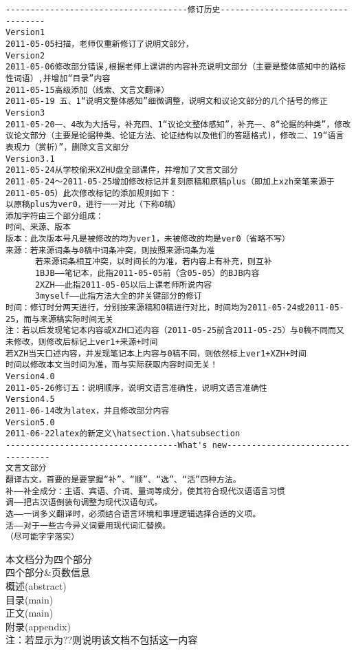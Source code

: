 \begin{verbatim}
-------------------------------------修订历史----------------------------------
Version1
2011-05-05扫描，老师仅重新修订了说明文部分，
Version2
2011-05-06修改部分错误,根据老师上课讲的内容补充说明文部分（主要是整体感知中的路标性词语）,并增加“目录”内容
2011-05-15高级添加（线索、文言文翻译）
2011-05-19 五、1“说明文整体感知”细微调整，说明文和议论文部分的几个括号的修正
Version3
2011-05-20一、4改为大括号，补充四、1“议论文整体感知”，补充一、8“论据的种类”，修改议论文部分（主要是论据种类、论证方法、论证结构以及他们的答题格式)，修改二、19“语言表现力（赏析）”，删除文言文部分
Version3.1
2011-05-24从学校偷来XZHU盘全部课件，并增加了文言文部分
2011-05-24～2011-05-25增加修改标记并复刻原稿和原稿plus（即加上xzh亲笔来源于2011-05-05）此次修改标记的添加规则如下：
以原稿plus为ver0，进行一一对比（下称0稿）
添加字符由三个部分组成：
时间、来源、版本
版本：此次版本号凡是被修改的均为ver1，未被修改的均是ver0（省略不写）
来源：若来源词条与0稿中词条冲突，则按照来源词条为准
      若来源词条相互冲突，以时间长的为准，若内容上有补充，则互补
      1BJB——笔记本，此指2011-05-05前（含05-05）的BJB内容
      2XZH——此指2011-05-05以后上课老师所说内容
      3myself——此指方法大全的非关键部分的修订
时间：修订时分两天进行，分别按来源稿和0稿进行对比，时间均为2011-05-24或2011-05-25，而与来源稿实际时间无关
注：若以后发现笔记本内容或XZH口述内容（2011-05-25前含2011-05-25）与0稿不同而又未修改，则修改后标记上ver1+来源+时间
若XZH当天口述内容，并发现笔记本上内容与0稿不同，则依然标上ver1+XZH+时间
时间以修改本文当时间为准，而与实际获取内容时间无关！
Version4.0
2011-05-26修订五：说明顺序，说明文语言准确性，说明文语言准确性
Version4.5
2011-06-14改为latex，并且修改部分内容
Version5.0
2011-06-22latex的新定义\hatsection.\hatsubsection
-----------------------------------What's new----------------------------------
文言文部分
翻译古文，首要的是要掌握“补”、“顺”、“选”、“活”四种方法。
补——补全成分：主语、宾语、介词、量词等成分，使其符合现代汉语语言习惯
调——把古汉语倒装句调整为现代汉语句式。
选——一词多义翻译时，必须结合语言环境和事理逻辑选择合适的义项。
活——对于一些古今异义词要用现代词汇替换。
（尽可能字字落实）
\end{verbatim}
本文档分为四个部分\\
四个部分\&页数信息\\
概述(abstract)\pageref{abstract}\\
目录(main)\pageref{contents}\\
正文(main)\pageref{main}\\
附录(appendix)\pageref{appendix}\\
注：若显示为??则说明该文档不包括这一内容
\newpage
